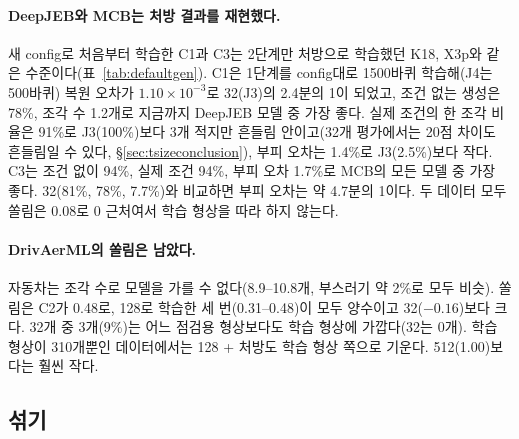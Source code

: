 \documentclass[11pt]{article}
\begin{document}
\paragraph{DeepJEB와 MCB는 처방 결과를 재현했다.} 새 config로 처음부터 학습한 C1과 C3는 2단계만 처방으로 학습했던 K18, X3p와 같은 수준이다(표~\ref{tab:defaultgen}).
C1은 1단계를 config대로 1500바퀴 학습해(J4는 500바퀴) 복원 오차가 $1.10\times10^{-3}$로 32(J3)의 2.4분의 1이 되었고, 조건 없는 생성은 78\%, 조각 수 1.2개로 지금까지 DeepJEB 모델 중 가장 좋다.
실제 조건의 한 조각 비율은 91\%로 J3(100\%)보다 3개 적지만 흔들림 안이고(32개 평가에서는 20점 차이도 흔들림일 수 있다, \S\ref{sec:tsizeconclusion}), 부피 오차는 1.4\%로 J3(2.5\%)보다 작다.
C3는 조건 없이 94\%, 실제 조건 94\%, 부피 오차 1.7\%로 MCB의 모든 모델 중 가장 좋다. 32(81\%, 78\%, 7.7\%)와 비교하면 부피 오차는 약 4.7분의 1이다.
두 데이터 모두 쏠림은 0.08로 0 근처여서 학습 형상을 따라 하지 않는다.

\paragraph{DrivAerML의 쏠림은 남았다.} 자동차는 조각 수로 모델을 가를 수 없다(8.9--10.8개, 부스러기 약 2\%로 모두 비슷). 쏠림은 C2가 0.48로, 128로 학습한 세 번(0.31--0.48)이 모두 양수이고
32($-0.16$)보다 크다. 32개 중 3개(9\%)는 어느 점검용 형상보다도 학습 형상에 가깝다(32는 0개). 학습 형상이 310개뿐인 데이터에서는 128 + 처방도 학습 형상 쪽으로 기운다. 512(1.00)보다는 훨씬 작다.

\subsection{섞기}
\end{document}
